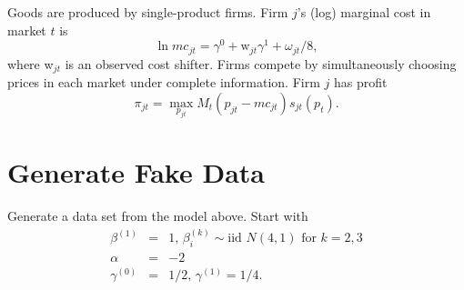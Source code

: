 \documentclass[english,11pt]{article}
\begin{document}
Goods are produced by single-product firms. Firm $j$'s (log) marginal
cost in market $t$ is 
\begin{equation*}
\ln mc_{jt}=\gamma ^{0}+\text{w}_{jt}\gamma ^{1}+\omega _{jt}/8,
\end{equation*}%
where w$_{jt}$ is an observed cost shifter. Firms compete by simultaneously choosing prices in each market under complete information. Firm $j$ has profit
\begin{equation*}
\pi _{jt}=\max_{p_{jt}}M_{t}(p_{jt}-mc_{jt})s_{jt}(p_{t}).
\end{equation*}

\section{Generate Fake Data}

Generate a data set from the model above. Start with%
\begin{eqnarray*}
\beta ^{(1)} &=&1\text{, }\beta _{i}^{\left( k\right) }\sim \text{iid }%
N\left( 4,1\right) \text{ for }k=2,3 \\
\alpha  &=&-2 \\
\gamma ^{(0)} &=&1/2\text{, }\gamma ^{(1)}=1/4.
\end{eqnarray*}
\end{document}
